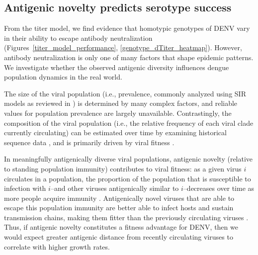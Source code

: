 \documentclass[11pt,oneside,letterpaper]{article}
\begin{document}
\subsection*{Antigenic novelty predicts serotype success}
From the titer model, we find evidence that homotypic genotypes of DENV vary in their ability to escape antibody neutralization (Figures~\ref{titer_model_performance}, \ref{genotype_dTiter_heatmap}).
However, antibody neutralization is only one of many factors that shape epidemic patterns.
We investigate whether the observed antigenic diversity influences dengue population dynamics in the real world.

The size of the viral population (i.e., prevalence, commonly analyzed using SIR models as reviewed in \citep{lourencco2018challenges}) is determined by many complex factors, and reliable values for population prevalence are largely unavailable.
Contrastingly, the composition of the viral population (i.e., the relative frequency of each viral clade currently circulating) can be estimated over time by examining historical sequence data \citep{lee2018deep,neher2016prediction}, and is primarily driven by viral fitness \citep{bedford2011strength}.

In meaningfully antigenically diverse viral populations, antigenic novelty (relative to standing population immunity) contributes to viral fitness: as a given virus $i$ circulates in a population, the proportion of the population that is susceptible to infection with $i$--and other viruses antigenically similar to $i$--decreases over time as more people acquire immunity \citep{bedford2012canalization, luksza2014predictive}.
Antigenically novel viruses that are able to escape this population immunity are better able to infect hosts and sustain transmission chains, making them fitter than the previously circulating viruses \citep{zhang2005clade, bedford2012canalization}.
Thus, if antigenic novelty constitutes a fitness advantage for DENV, then we would expect greater antigenic distance from recently circulating viruses to correlate with higher growth rates.
\end{document}
